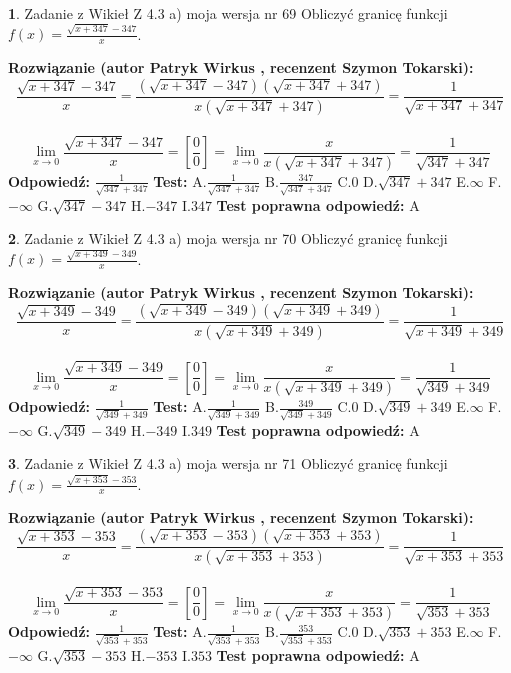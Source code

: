 \documentclass[12pt, a4paper]{article}
\theoremstyle{definition} %
\newtheorem{zad}{}
\newcommand{\zadStart}[1]{\begin{zad}#1\newline}
\newcommand{\zadStop}{\end{zad}}
\newcommand{\rozwStart}[2]{\noindent \textbf{Rozwiązanie (autor #1 , recenzent #2): }\newline}
\newcommand{\rozwStop}{\newline}
\newcommand{\odpStart}{\noindent \textbf{Odpowiedź:}\newline}
\newcommand{\odpStop}{\newline}
\newcommand{\testStart}{\noindent \textbf{Test:}\newline}
\newcommand{\testStop}{\newline}
\newcommand{\kluczStart}{\noindent \textbf{Test poprawna odpowiedź:}\newline}
\newcommand{\kluczStop}{\newline}
\begin{document}
\zadStart{Zadanie z Wikieł Z 4.3 a) moja wersja nr 69}
Obliczyć granicę funkcji $f(x)=\frac{\sqrt{x+347}-347}{x}$.
\zadStop
\rozwStart{Patryk Wirkus}{Szymon Tokarski}
$$\frac{\sqrt{x+347}-347}{x}=\frac{(\sqrt{x+347}-347)(\sqrt{x+347}+347)}{x(\sqrt{x+347}+347)}=\frac{1}{\sqrt{x+347}+347}$$
\\
$$\lim\limits_{x\to0}\frac{\sqrt{x+347}-347}{x}=[\frac{0}{0}]=
\lim\limits_{x\to0}\frac{x}{x(\sqrt{x+347}+347)} = \frac{1}{\sqrt{347}+347}$$
\rozwStop
\odpStart
$\frac{1}{\sqrt{347}+347}$
\odpStop
\testStart
A.$\frac{1}{\sqrt{347}+347}$
B.$\frac{347}{\sqrt{347}+347}$
C.$0$
D.$\sqrt{347}+347$
E.$\infty$
F.$-\infty$
G.$\sqrt{347}-347$
H.$-347$
I.$347$
\testStop
\kluczStart
A
\kluczStop



\zadStart{Zadanie z Wikieł Z 4.3 a) moja wersja nr 70}
Obliczyć granicę funkcji $f(x)=\frac{\sqrt{x+349}-349}{x}$.
\zadStop
\rozwStart{Patryk Wirkus}{Szymon Tokarski}
$$\frac{\sqrt{x+349}-349}{x}=\frac{(\sqrt{x+349}-349)(\sqrt{x+349}+349)}{x(\sqrt{x+349}+349)}=\frac{1}{\sqrt{x+349}+349}$$
\\
$$\lim\limits_{x\to0}\frac{\sqrt{x+349}-349}{x}=[\frac{0}{0}]=
\lim\limits_{x\to0}\frac{x}{x(\sqrt{x+349}+349)} = \frac{1}{\sqrt{349}+349}$$
\rozwStop
\odpStart
$\frac{1}{\sqrt{349}+349}$
\odpStop
\testStart
A.$\frac{1}{\sqrt{349}+349}$
B.$\frac{349}{\sqrt{349}+349}$
C.$0$
D.$\sqrt{349}+349$
E.$\infty$
F.$-\infty$
G.$\sqrt{349}-349$
H.$-349$
I.$349$
\testStop
\kluczStart
A
\kluczStop



\zadStart{Zadanie z Wikieł Z 4.3 a) moja wersja nr 71}
Obliczyć granicę funkcji $f(x)=\frac{\sqrt{x+353}-353}{x}$.
\zadStop
\rozwStart{Patryk Wirkus}{Szymon Tokarski}
$$\frac{\sqrt{x+353}-353}{x}=\frac{(\sqrt{x+353}-353)(\sqrt{x+353}+353)}{x(\sqrt{x+353}+353)}=\frac{1}{\sqrt{x+353}+353}$$
\\
$$\lim\limits_{x\to0}\frac{\sqrt{x+353}-353}{x}=[\frac{0}{0}]=
\lim\limits_{x\to0}\frac{x}{x(\sqrt{x+353}+353)} = \frac{1}{\sqrt{353}+353}$$
\rozwStop
\odpStart
$\frac{1}{\sqrt{353}+353}$
\odpStop
\testStart
A.$\frac{1}{\sqrt{353}+353}$
B.$\frac{353}{\sqrt{353}+353}$
C.$0$
D.$\sqrt{353}+353$
E.$\infty$
F.$-\infty$
G.$\sqrt{353}-353$
H.$-353$
I.$353$
\testStop
\kluczStart
A
\kluczStop
\end{document}
